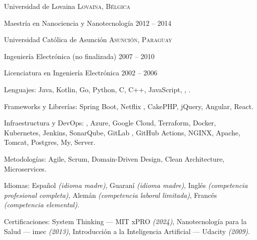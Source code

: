\documentclass[10pt,a4paper]{article} %
\begin{document}

\headedsection
{Universidad de Lovaina}
{\textsc{Lovaina, Bélgica}} {

\headedsubsection
{Maestría en Nanociencia y Nanotecnología}
{2012 -- 2014}
{}
}


\headedsection
{Universidad Católica de Asunción}
{\textsc{Asunción, Paraguay}} {

\headedsubsection
{Ingeniería Electrónica \textnormal{(no finalizada)}}
{2007 -- 2010} {}

\headedsubsection
{Licenciatura en Ingeniería Electrónica}
{2002 -- 2006} {}
}

\spacedhrule{0.5em}{-0.4em} %



\inlineheadsection
{Lenguajes:}
{Java, Kotlin, Go, Python, C, C++, JavaScript, , .}

\inlineheadsection
{Frameworks y Librerías:}
{Spring Boot, Netflix , CakePHP, jQuery, Angular, React.}

\inlineheadsection
{Infraestructura y DevOps:}
{, Azure, Google Cloud, Terraform, Docker, Kubernetes, Jenkins, SonarQube, GitLab , GitHub Actions, NGINX, Apache, Tomcat, Postgres, My, Server.}

\inlineheadsection
{Metodologías:}
{Agile, Scrum, Domain-Driven Design, Clean Architecture, Microservices.}

\inlineheadsection
{Idiomas:}
{Español \textit{(idioma madre)}, Guaraní \textit{(idioma madre)}, Inglés \textit{(competencia profesional completa)}, Alemán \textit{(competencia laboral limitada)}, Francés \textit{(competencia elemental)}.}

\inlineheadsection
{Certificaciones:}
{System Thinking --- MIT xPRO \textit{(2024)}, Nanotecnología para la Salud --- imec \textit{(2013)}, Introducción a la Inteligencia Artificial --- Udacity \textit{(2009)}.}

\end{document}
